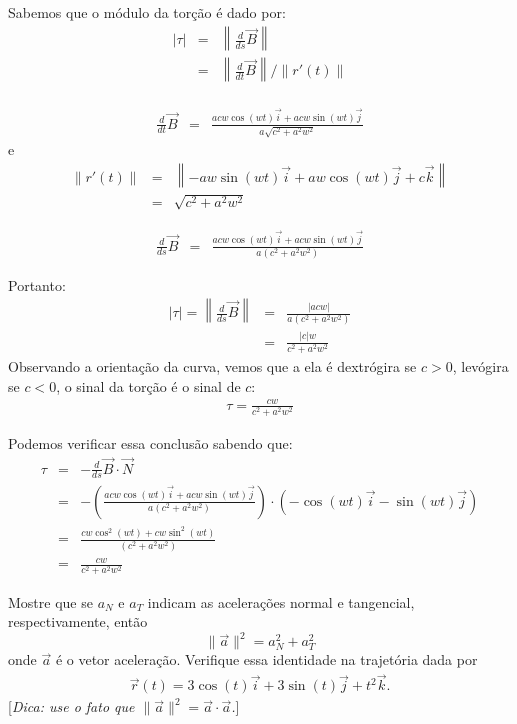\begin{resol}
Sabemos que o módulo da torção é dado por:
\begin{eqnarray*}
|\tau|&=&\left\|\frac{d}{ds}\vec{B}\right\|\\
&=& \left\|\frac{d}{dt}\vec{B} \right\|/\|r'(t)\|\\
\end{eqnarray*}

\begin{eqnarray*}
 \frac{d}{dt}\vec{B}
&=&\frac{acw\cos(wt)\vec{i}+acw\sin(wt)\vec{j}}{a\sqrt{c^2+a^2w^2}}
\end{eqnarray*}
e
\begin{eqnarray*}
\|r'(t)\|&=&\left\|-aw\sin(wt)\vec{i}+aw\cos(wt)\vec{j}+c\vec{k}\right\|\\
&=&\sqrt{c^2+a^2w^2}
\end{eqnarray*}


\begin{eqnarray*}
 \frac{d}{ds}\vec{B}
&=&\frac{acw\cos(wt)\vec{i}+acw\sin(wt)\vec{j}}{a(c^2+a^2w^2)}
\end{eqnarray*}

Portanto:
\begin{eqnarray*}
|\tau|=\left\|\frac{d}{ds}\vec{B}\right\|&=&
\frac{|acw|}{a(c^2+a^2w^2)}\\
&=&\frac{|c|w}{{c^2+a^2w^2}}
\end{eqnarray*}
Observando a orientação da curva, vemos que a ela é dextrógira se $c>0$, levógira se $c<0$, o sinal da torção é o sinal de $c$:
\begin{eqnarray*}
\tau=\frac{cw}{{c^2+a^2w^2}}
\end{eqnarray*}

Podemos verificar essa conclusão sabendo que:
\begin{eqnarray*}
\tau&=&-\frac{d}{ds}\vec{B}\cdot\vec{N}\\
&=&-\left(\frac{acw\cos(wt)\vec{i}+acw\sin(wt)\vec{j}}{a(c^2+a^2w^2)}\right)\cdot\left(-\cos(wt)\vec{i}-\sin(wt)\vec{j}\right)\\
&=&\frac{cw\cos^2(wt)+cw\sin^2(wt)}{(c^2+a^2w^2)}\\
&=&\frac{cw}{c^2+a^2w^2}
\end{eqnarray*}

\end{resol}

\begin{exeresol} Mostre que se $a_N$ e $a_T$ indicam as acelerações normal e tangencial, respectivamente, então
$$\|\vec{a}\|^2=a_N^2+a_T^2$$
onde $\vec{a}$ é o vetor aceleração. Verifique essa identidade na trajetória dada por
\begin{eqnarray*}
 \vec{r}(t)=3\cos (t) \vec{i} + 3\sin (t) \vec{j} +t^2\vec{k}.
\end{eqnarray*}
[{\it Dica: use o fato que $\|\vec{a}\|^2=\vec{a}\cdot\vec{a}$.}]
\end{exeresol}

